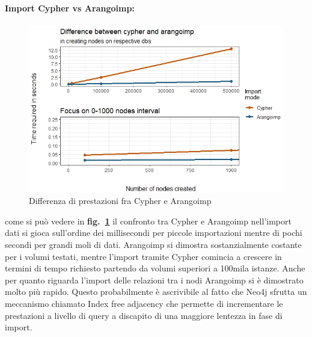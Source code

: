 \documentclass[fleqn,10pt]{SelfArx} %
\begin{document}
{{\paragraph{Import Cypher vs Arangoimp:}
\begin{figure}
\centering
\includegraphics[scale=0.54]{viz_benchmark_cypher_arangoimp.jpeg}
\vspace*{0.01cm}
\caption{\footnotesize \label{plot_cypher_arangoimp} Differenza di prestazioni fra Cypher e Arangoimp}
\end{figure}
come si può vedere in \textbf{fig.~\ref{plot_cypher_arangoimp}} il confronto tra Cypher e Arangoimp nell'import dati si gioca sull'ordine dei millisecondi per piccole importazioni mentre di pochi secondi per grandi moli di dati. 
Arangoimp si dimostra sostanzialmente costante per i volumi testati, mentre l'import tramite Cypher comincia a crescere in termini di tempo richiesto partendo da volumi superiori a 100mila istanze. 
Anche per quanto riguarda l'import delle relazioni tra i nodi Arangoimp si è dimostrato molto più rapido. 
Questo probabilmente è ascrivibile al fatto che Neo4j sfrutta un meccanismo chiamato Index free adjacency che permette di incrementare le prestazioni a livello di query a discapito di una maggiore lentezza in fase di import. 
}}
\end{document}
